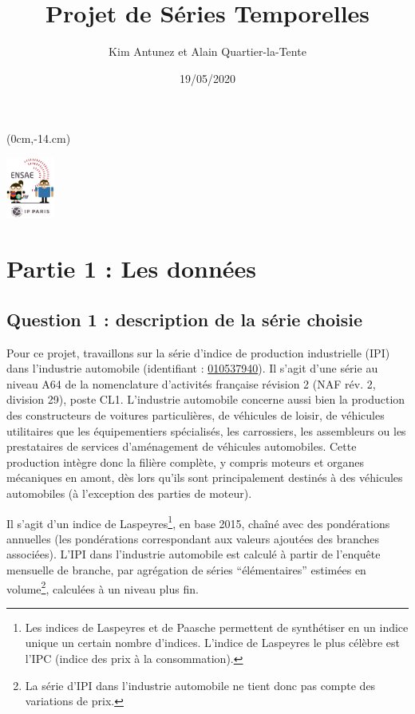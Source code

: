 \documentclass[french]{article}
\title{Projet de Séries Temporelles}
\author{Kim Antunez et Alain Quartier-la-Tente}
\date{19/05/2020}
\begin{document}
\maketitle

{
\hypersetup{linkcolor=}
\setcounter{tocdepth}{3}
\tableofcontents
}
\begin{textblock*}{\textwidth}(0cm,-14.cm)
\begin{center}
\includegraphics[height=2cm]{img/LOGO-ENSAE-avatar.png}
\end{center}
\end{textblock*}

\thispagestyle{empty}
\newpage\setcounter{page}{1}

\hypertarget{partie-1-les-donnuxe9es}{%
\section{Partie 1 : Les données}\label{partie-1-les-donnuxe9es}}

\hypertarget{question-1-description-de-la-suxe9rie-choisie}{%
\subsection{Question 1 : description de la série choisie}\label{question-1-description-de-la-suxe9rie-choisie}}

Pour ce projet, travaillons sur la série d'indice de production industrielle (IPI) dans l'industrie automobile (identifiant : \href{https://bdm.insee.fr/series/sdmx/data/SERIES_BDM/010537940}{010537940}).
Il s'agit d'une série au niveau A64 de la nomenclature d'activités française révision 2 (NAF rév. 2, division 29), poste CL1.
L'industrie automobile concerne aussi bien la production des constructeurs de voitures particulières, de véhicules de loisir, de véhicules utilitaires que les équipementiers spécialisés, les carrossiers, les assembleurs ou les prestataires de services d'aménagement de véhicules automobiles.
Cette production intègre donc la filière complète, y compris moteurs et organes mécaniques en amont, dès lors qu'ils sont principalement destinés à des véhicules automobiles (à l'exception des parties de moteur).

Il s'agit d'un indice de Laspeyres\footnote{Les indices de Laspeyres et de Paasche permettent de synthétiser en un indice unique un certain nombre d'indices. L'indice de Laspeyres le plus célèbre est l'IPC (indice des prix à la consommation).}, en base 2015, chaîné avec des pondérations annuelles (les pondérations correspondant aux valeurs ajoutées des branches associées).
L'IPI dans l'industrie automobile est calculé à partir de l'enquête mensuelle de branche, par agrégation de séries ``élémentaires'' estimées en volume\footnote{La série d'IPI dans l'industrie automobile ne tient donc pas compte des variations de prix.}, calculées à un niveau plus fin.
\end{document}
